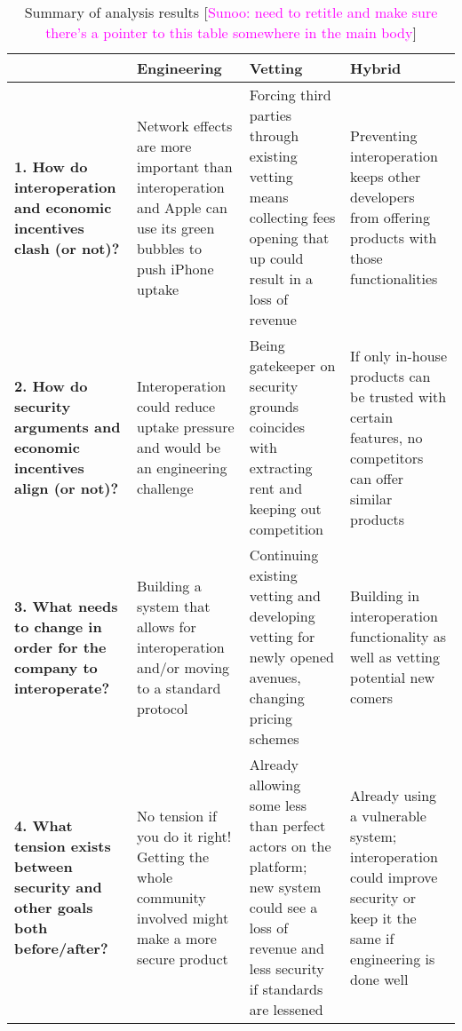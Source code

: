 \documentclass[letterpaper,twocolumn,10pt]{article}
\newcommand{\sunoo}[1]{[\textcolor{magenta}{Sunoo: #1}]}
\newcommand{\sunoo}[1]{\ignorespaces}
\begin{document}
\begin{table*}[ht]
\centering
\renewcommand{\arraystretch}{1.5} %
\begin{tabularx}{\textwidth}{|X|X|X|X|}

\hline
&\textbf{Engineering} & \textbf{Vetting} & \textbf{Hybrid} \\
\hline
\textbf{1. How do interoperation and economic incentives clash (or not)? } & Network effects are more important than interoperation and Apple can use its green bubbles to push iPhone uptake  & Forcing third parties through existing vetting means collecting fees opening that up could result in a loss of revenue & Preventing interoperation keeps other developers from offering products with those functionalities \\ 
\hline
\textbf{2. How do security arguments and economic incentives align (or not)?} & Interoperation could reduce uptake pressure and would be an engineering challenge & Being gatekeeper on security grounds coincides with extracting rent and keeping out competition & If only in-house products can be trusted with certain features, no competitors can offer similar products  \\
\hline
\textbf{3. What needs to change in order for the company to
interoperate? } & Building a system that allows for interoperation and/or moving to a standard protocol & Continuing existing vetting and developing vetting for newly opened avenues, changing pricing schemes & Building in interoperation functionality as well as vetting potential new comers  \\

\hline
\textbf{4. What tension exists between security and other goals
both before/after?} & No tension if you do it right! Getting the whole community involved might make a more secure product & Already allowing some less than perfect actors on the platform; new system could see a loss of revenue and less security if standards are lessened & Already using a vulnerable system; interoperation could improve security or keep it the same if engineering is done well  \\
\hline
\end{tabularx}

\caption{Summary of analysis results \sunoo{need to retitle and make sure there's a pointer to this table somewhere in the main body}}
\label{tab:big_table}
\end{table*}
\end{document}
